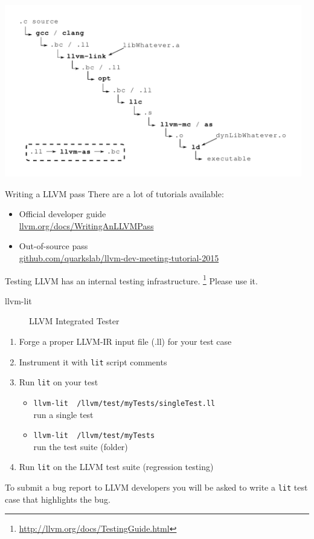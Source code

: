 \documentclass[10pt,mathserif]{beamer}
\begin{document}
\begin{frame}
	\noindent\hspace{-1.2cm}\includegraphics[width=13cm]{img/03/toolchain}
\end{frame}

\begin{frame}{Writing a LLVM pass}
	There are a lot of tutorials available:
	\vfill
	\begin{itemize}
		\item Official developer guide\\ \href{http://llvm.org/docs/WritingAnLLVMPass.html}{\url{llvm.org/docs/WritingAnLLVMPass}}
		\vfill
		\item Out-of-source pass\\ \href{https://github.com/quarkslab/llvm-dev-meeting-tutorial-2015}{\url{github.com/quarkslab/llvm-dev-meeting-tutorial-2015}}
	\end{itemize}
\end{frame}

\begin{frame}{Testing}
	LLVM has an internal testing infrastructure. \footnote{\url{http://llvm.org/docs/TestingGuide.html}}
	Please use it.
	\\
	\begin{description}
		\item[llvm-lit] LLVM Integrated Tester
	\end{description}
	\begin{enumerate}
		\item Forge a proper LLVM-IR input file (.ll) for your test case
		\item Instrument it with \texttt{lit} script comments
		\item Run \texttt{lit} on your test
		\begin{itemize}
			\item \texttt{llvm-lit ~/llvm/test/myTests/singleTest.ll}\\ run a single test
			\item \texttt{llvm-lit ~/llvm/test/myTests}\\ run the test suite (folder)
		\end{itemize}
		\item Run \texttt{lit} on the LLVM test suite (regression testing)
	\end{enumerate}
	\vfill
	To submit a bug report to LLVM developers you will be asked to write a \texttt{lit} test case that highlights the bug.
\end{frame}
\end{document}

